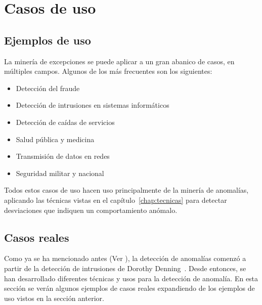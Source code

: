 \chapter{Casos de uso}\label{chap:cus}
\section{Ejemplos de uso}
La minería de excepciones se puede aplicar a un gran abanico de casos, en múltiples campos.
Algunos de los más frecuentes son los siguientes:
\begin{itemize}
	\item Detección del fraude
	\item Detección de intrusiones en sistemas informáticos
	\item Detección de caídas de servicios
	\item Salud pública y medicina
	\item Transmisión de datos en redes
	\item Seguridad militar y nacional
\end{itemize}

Todos estos casos de uso hacen uso principalmente de la minería de anomalías, aplicando las
técnicas vistas en el capítulo~\ref{chap:tecnicas} para detectar desviaciones que indiquen un
comportamiento anómalo.

\section{Casos reales}\label{sect:reales}
Como ya se ha mencionado antes (Ver ), la detección de anomalías comenzó a partir
de la detección de intrusiones de Dorothy Denning~\cite{denning1987intrusion}. Desde entonces, se
han desarrollado diferentes técnicas y usos para la detección de anomalía. En esta sección se
verán algunos ejemplos de casos reales expandiendo de los ejemplos de uso vistos en la sección
anterior.

